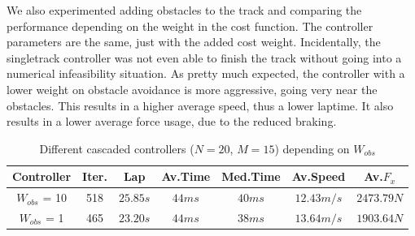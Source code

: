 \documentclass[a4paper, onecolumn, 11pt]{article}
\begin{document}
We also experimented adding obstacles to the track and comparing the performance
depending on the weight in the cost function. The controller parameters are the
same, just with the added cost weight. Incidentally, the singletrack controller
was not even able to finish the track without going into a numerical
infeasibility situation. As pretty much expected, the controller with a lower weight on obstacle
avoidance is more aggressive, going very near the obstacles. This results in a
higher average speed, thus a lower laptime. It also results in a lower average
force usage, due to the reduced braking.
\begin{table}[H] 
    \centering
    \caption{Different cascaded controllers ($N=20$, $M=15$) depending on $W_{obs}$} \label{obstacles_ippodromo}
    \begin{tabular}{|c||c|c|c|c|c|c|}
        \hline
        \textbf{Controller} & \textbf{Iter.} & \textbf{Lap} & \textbf{Av.Time} & \textbf{Med.Time} & \textbf{Av.Speed} & \textbf{Av.$F_x$} \\ [0.5ex] 
        \hline
        \hline
        $W_{obs}$ = 10 & 518 & $25.85 s$ & $44 ms$ & $40 ms$ & $12.43 m/s$ & $2473.79 N$\\
        \hline
        $W_{obs}$ = 1 & 465 & $23.20 s$ & $44 ms$ & $38 ms$ & $13.64 m/s$ & $1903.64 N$\\
        \hline
    \end{tabular}
\end{table}
\end{document}
